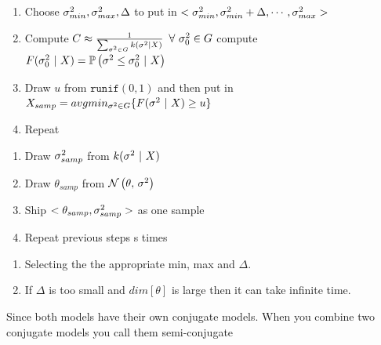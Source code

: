 \documentclass[12pt]{article}
\begin{document}
\begin{enumerate}
\begin{enumerate}
    \item Choose $\sigma^2_{min}, \sigma^2_{max}, \Delta$ to put in  $<\sigma^2_{min}, \sigma^2_{min} + \Delta, \cdots, \sigma^2_{max}>$ 
    \item Compute $C \approx \frac{1}{\sum_{\sigma^2 \in G} k(\sigma^2|X)}$  $ \forall ~ \sigma^2_0 \in G$ compute $F(\sigma^2_0~|~X) = \mathbb{P}\left(\sigma^2 \leq \sigma^2_0~|~X\right)$
    \item Draw $u$ from $\texttt{runif}(0,1)$ and then put in $X_{samp} = avgmin_{\sigma^2 \in G} \{ F(\sigma^2~|~X) \geq u \}$
    \item Repeat
\end{enumerate}


 
\begin{enumerate}
    \item Draw $\sigma^2_{samp}$ from $k(\sigma^2~|~X)$
    \item Draw $\theta_{samp}$ from $\mathcal{N}\left(\theta,\,\sigma^2\right)$
    \item Ship $<\theta_{samp}, \sigma^2_{samp}>$ as one sample
    \item Repeat previous steps s times
\end{enumerate}



\begin{enumerate}
    \item Selecting the the appropriate min, max and $\Delta$.
    \item If $\Delta$ is too small and $dim[\theta]$ is large then it can take infinite time.
\end{enumerate}


Since both models have their own conjugate models. When you combine two conjugate models you call them semi-conjugate


\end{enumerate}
\end{document}

